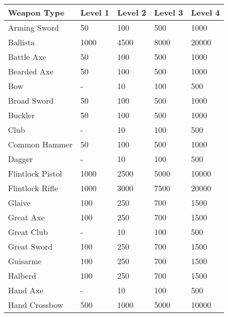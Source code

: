 \begin{longtable}{l | p{1.75cm} | p{1.75cm} | p{1.75cm} | p{1.75cm}}
	Weapon Type & Level 1 & Level 2 & Level 3 & Level 4\\ \hline
	
	Arming Sword & 50 & 100 & 500 & 1000\\
	
	Ballista & 1000 & 4500 & 8000 & 20000 \\
	
	Battle Axe & 50 & 100 & 500 & 1000\\
	
	Bearded Axe & 50 & 100 & 500 & 1000\\
	
	Bow & - & 10 & 100 & 500\\
	
	Broad Sword & 50 & 100 & 500 & 1000\\
	
	Buckler & 50 & 100 & 500 & 1000\\
	
	Club & - & 10 & 100 & 500\\
	
	Common Hammer & 50 & 100 & 500 & 1000\\
	
	Dagger & - & 10 & 100 & 500\\
	
	Flintlock Pistol & 1000 & 2500 & 5000 & 10000\\
	
	Flintlock Rifle & 1000 & 3000 & 7500 & 20000\\
	
	Glaive & 100 & 250 & 700 & 1500 \\
	
	Great Axe & 100 & 250 & 700 & 1500 \\
	
	Great Club & - & 10 & 100 & 500\\
	
	Great Sword & 100 & 250 & 700 & 1500 \\
	
	Guisarme & 100 & 250 & 700 & 1500 \\
	
	Halberd & 100 & 250 & 700 & 1500 \\
	
	Hand Axe & - & 10 & 100 & 500\\
	
	Hand Crossbow & 500 & 1000 & 5000 & 10000\\
	

\end{longtable}
